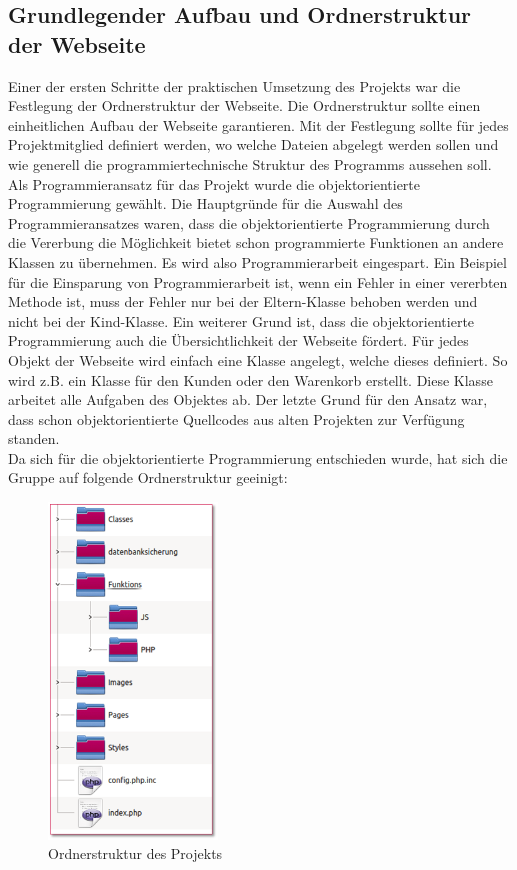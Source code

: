 \subsection{Grundlegender Aufbau und Ordnerstruktur der Webseite}
Einer der ersten Schritte der praktischen Umsetzung des Projekts war die Festlegung der Ordnerstruktur der Webseite. Die Ordnerstruktur sollte einen einheitlichen Aufbau der Webseite garantieren. Mit der Festlegung sollte für jedes Projektmitglied definiert werden, wo welche Dateien abgelegt werden sollen und wie generell die programmiertechnische Struktur des Programms aussehen soll.  \\
Als Programmieransatz für das Projekt wurde die objektorientierte Programmierung gewählt. Die Hauptgründe für die Auswahl des Programmieransatzes waren, dass die objektorientierte Programmierung durch die Vererbung die Möglichkeit bietet schon programmierte Funktionen an andere Klassen zu übernehmen. Es wird also Programmierarbeit eingespart. Ein Beispiel für die Einsparung von Programmierarbeit ist, wenn ein Fehler in einer vererbten Methode ist, muss der Fehler nur bei der Eltern-Klasse behoben werden und nicht bei der Kind-Klasse. Ein weiterer Grund ist, dass die objektorientierte Programmierung auch die Übersichtlichkeit der Webseite fördert. Für jedes Objekt der Webseite wird einfach eine Klasse angelegt, welche dieses definiert. So wird z.B. ein Klasse für den Kunden oder den Warenkorb erstellt. Diese Klasse arbeitet alle Aufgaben des Objektes ab. Der letzte Grund für den Ansatz war, dass schon objektorientierte Quellcodes aus alten Projekten zur Verfügung standen. \\
Da sich für die objektorientierte Programmierung entschieden wurde, hat sich die Gruppe auf folgende Ordnerstruktur geeinigt:
\begin{figure}[H]
  \centering
     \includegraphics[width=45mm]{Bilder/ordnerstruktur.png}
  \caption{Ordnerstruktur des Projekts}
  \label{fig:Abbildung 4}
\end{figure}
